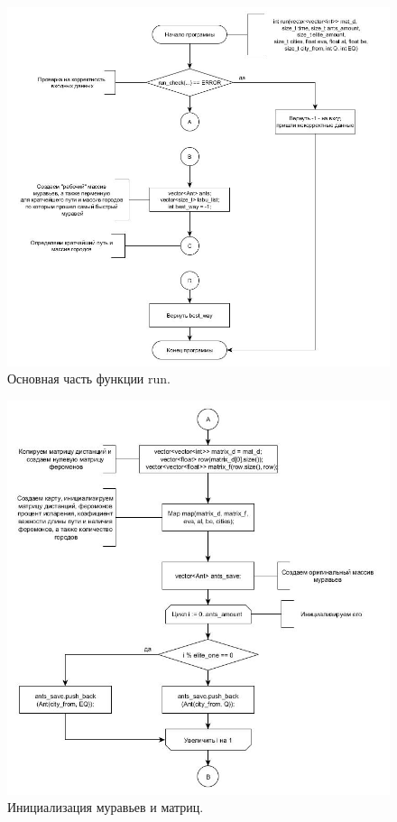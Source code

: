 \documentclass[a4paper, 14pt]{article}
\begin{document}
\begin{figure}[h!]
\center
\includegraphics[scale=0.5]{run_1_main.jpg}
\caption{Основная часть функции run.}
\label{ris:run_1}
\end{figure}\newpage

\begin{figure}[h!]
\center
\includegraphics[scale=0.6]{run_2_ab.jpg}
\caption{Инициализация муравьев и матриц.}
\label{ris:run_2}
\end{figure}\newpage
\end{document}
